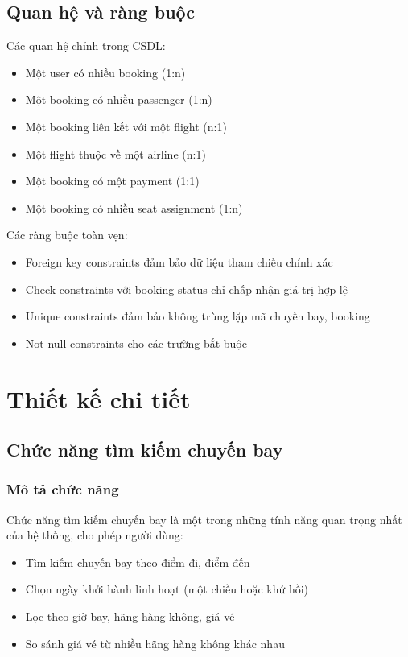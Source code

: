 \subsection{Quan hệ và ràng buộc}
Các quan hệ chính trong CSDL:

\begin{itemize}[leftmargin=1cm]
    \item Một user có nhiều booking (1:n)
    \item Một booking có nhiều passenger (1:n)
    \item Một booking liên kết với một flight (n:1)
    \item Một flight thuộc về một airline (n:1)
    \item Một booking có một payment (1:1)
    \item Một booking có nhiều seat assignment (1:n)
\end{itemize}

Các ràng buộc toàn vẹn:
\begin{itemize}[leftmargin=1cm]
    \item Foreign key constraints đảm bảo dữ liệu tham chiếu chính xác
    \item Check constraints với booking status chỉ chấp nhận giá trị hợp lệ
    \item Unique constraints đảm bảo không trùng lặp mã chuyến bay, booking
    \item Not null constraints cho các trường bắt buộc
\end{itemize}

\section{Thiết kế chi tiết}

\subsection{Chức năng tìm kiếm chuyến bay}

\subsubsection{Mô tả chức năng}
Chức năng tìm kiếm chuyến bay là một trong những tính năng quan trọng nhất của hệ thống, cho phép người dùng:

\begin{itemize}[leftmargin=1cm]
    \item Tìm kiếm chuyến bay theo điểm đi, điểm đến
    \item Chọn ngày khởi hành linh hoạt (một chiều hoặc khứ hồi)
    \item Lọc theo giờ bay, hãng hàng không, giá vé
    \item So sánh giá vé từ nhiều hãng hàng không khác nhau
\end{itemize}

